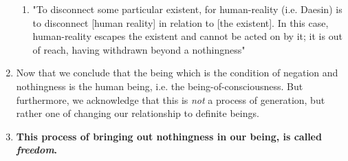 \begin{enumerate}
  \begin{enumerate}
    \item "To disconnect some particular existent, for human-reality (i.e. Daesin) is to disconnect [human reality] in relation to [the existent]. In this case, human-reality escapes the existent and cannot be acted on by it; it is out of reach, having withdrawn beyond a nothingness"
  \end{enumerate}
  \item Now that we conclude that the being which is the condition of negation and nothingness is the human being, i.e. the being-of-consciousness. But furthermore, we acknowledge that this is \emph{not} a process of generation, but rather one of changing our relationship to definite beings.
  \item \textbf{This process of bringing out nothingness in our being, is called \emph{freedom}.}


\end{enumerate}
